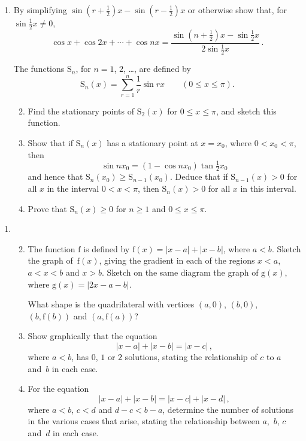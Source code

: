 \documentclass[a4, 11pt]{report}
\newlength{\qspace}
\newcounter{qnumber}
\newenvironment{question}%
 {\vspace{\qspace}
  \begin{enumerate}[\bfseries 1\quad][10]%
    \setcounter{enumi}{\value{qnumber}}%
    \item%
 }
{
  \end{enumerate}
  \filbreak
  \stepcounter{qnumber}
 }
\newenvironment{questionparts}[1][1]%
 {
  \begin{enumerate}[\bfseries (i)]%
    \setcounter{enumii}{#1}
    \addtocounter{enumii}{-1}
    \setlength{\itemsep}{5mm}
    \setlength{\parskip}{8pt}
 }
 {
  \end{enumerate}
 }
\def\le{\leqslant}
\def\ge{\geqslant}
\renewcommand{\.}[1]{\ensuremath{\mathrm{#1}}}
\newcommand{\+}[1]{\ensuremath{\mathbf{#1}}}
\begin{document}
\begin{question}
  By simplifying $\sin(r+\frac12)x - \sin(r-\frac12)x$ or
  otherwise show that, for $\sin\frac12 x \ne0$,
  \[
  \cos x + \cos 2x +\cdots + \cos nx = \frac{\sin(n+\frac12)x -
    \sin\frac12 x}{2\sin\frac12x}\,.
  \]

  The functions $\.S_n$, for $n=1$, $2$, \dots, are defined
  by
  \[
  \.S_n(x) = \sum_{r=1}^n \frac 1 r \sin rx \qquad (0\le
  x \le \pi).
  \]

  \begin{questionparts}
  \item Find the stationary points of $\.S_2(x)$ for $0\le x\le\pi$,
    and sketch this function.

  \item Show that if $\.S_n(x)$ has a stationary point at $x=x_0$,
    where $0< x_0 < \pi$, then
    \[
    \sin nx_0 = (1-\cos nx_0) \tan\tfrac12 x_0
    \]
    and hence that $\.S_n(x_0) \ge \.S_{n-1}(x_0)$.  Deduce that if
    $\.S_{n-1}(x)>0$ for all $x$ in the interval $0<x<\pi$, 
    then $\.S_{n}(x)>0$ for all $x$ in this interval.

  \item Prove that $\.S_n(x)\ge0$ for $n\ge1$ and 
 $0\le x\le\pi$.
  \end{questionparts}
\end{question}
	
\begin{question}
  \begin{questionparts}
  \item The function $\.f$ is defined by $\.f(x)= |x-a| + |x-b| $,
    where $a<b$.  Sketch the graph of~$\.f(x)$, giving the gradient in
    each of the regions $x<a$, $a<x<b$ and $x>b$.  Sketch on the same
    diagram the graph of $\.g(x)$, where $\.g(x)= |2x-a-b|$.

    What shape is the quadrilateral with vertices $(a,0)$, $(b,0)$,
$(b,\.f(b))$ and 
    $(a, \.f(a))$? 

  \item Show graphically that the equation
    \[
    |x-a| + |x-b| = |x-c|\,,
    \]
    where $a<b$, has $0$, $1$ or $2$ solutions, stating the
    relationship of $c$ to $a$ and~$b$ in each case.

  \item For the equation
    \[
    |x-a| + |x-b| = |x-c|+|x-d|\,,
    \]
    where $a<b$, $c<d$ and $d-c <b-a$, determine the number of
    solutions in the various cases that arise, stating the
    relationship between $a$,~$b$, $c$ and~$d$ in each case.
  \end{questionparts}
\end{question}
		
\end{document}
